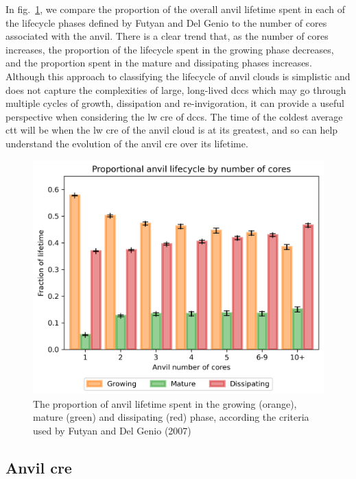 In fig.~\ref{fig:seviri_lifetime_proportions}, we compare the proportion of the overall anvil lifetime spent
in each of the lifecycle phases defined by Futyan and Del Genio to the
number of cores associated with the anvil. There is a clear trend that,
as the number of cores increases, the proportion of the lifecycle spent
in the growing phase decreases, and the proportion spent in the mature
and dissipating phases increases. Although this approach to classifying
the lifecycle of anvil clouds is simplistic and does not capture the
complexities of large, long-lived \acrshort{dcc}s which may go through multiple
cycles of growth, dissipation and re-invigoration, it can provide a
useful perspective when considering the \acrshort{lw} \acrshort{cre} of \acrshort{dcc}s. The time of the
coldest average \acrshort{ctt} will be when the \acrshort{lw} \acrshort{cre} of the anvil cloud is at its
greatest, and so can help understand the evolution of the anvil \acrshort{cre} over
its lifetime.


\begin{figure}[tp]
    \includegraphics[width=\textwidth]{figures/ch3_09.png}
    \caption[
    The proportion of anvil lifetime spent in the growing, mature and dissipating phase
    ]{
    The proportion of anvil lifetime spent in the growing (orange), mature (green) and dissipating (red) phase, according the criteria used by Futyan and Del Genio (2007)
    }
    \label{fig:seviri_lifetime_proportions}
\end{figure}


\subsection{Anvil \acrshort{cre}}


